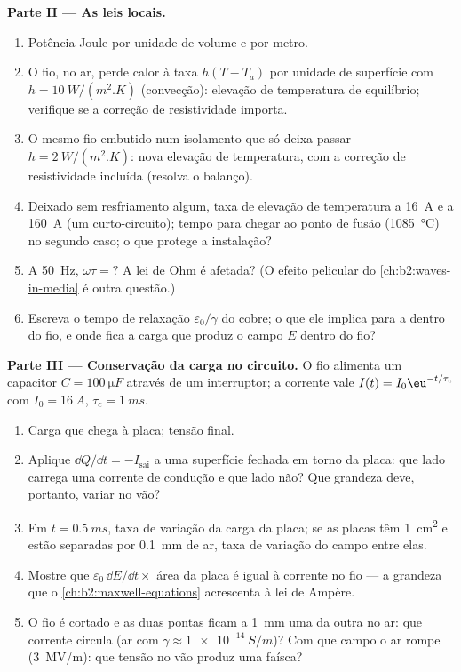 \begin{problem}
\medskip
\noindent\textbf{Parte II --- As leis locais.}
\begin{enumerate}[resume]
  \item Potência Joule por unidade de volume e por metro.
  \item O fio, no ar, perde calor à taxa $h(T - T_a)$ por unidade de
        superfície com $h = \qty{10}{W/(m^2.K)}$ (convecção): elevação de
        temperatura de equilíbrio; verifique se a correção de resistividade
        importa.
  \item O mesmo fio embutido num isolamento que só deixa passar $h =
        \qty{2}{W/(m^2.K)}$: nova elevação de temperatura, com a
        correção de resistividade incluída (resolva o balanço).
  \item Deixado sem resfriamento algum, taxa de elevação de temperatura a \qty{16}{A}
        e a \qty{160}{A} (um curto-circuito); tempo para chegar ao ponto de
        fusão (\qty{1085}{\degreeCelsius}) no segundo caso; o que protege
        a instalação?
  \item A \qty{50}{Hz}, $\omega\tau = ?$ A lei de Ohm é afetada? (O efeito
        pelicular do \cref{ch:b2:waves-in-media} é outra questão.)
  \item Escreva o tempo de relaxação $\varepsilon_0/\gamma$ do cobre; o que ele
        implica para a  dentro do fio, e onde fica
        a carga que produz o campo $E$ dentro do fio?
\end{enumerate}

\medskip
\noindent\textbf{Parte III --- Conservação da carga no circuito.}
O fio alimenta um capacitor $C = \qty{100}{\micro F}$ através de um interruptor; a
corrente vale $I(t) = I_0\eu^{-t/\tau_c}$ com $I_0 = \qty{16}{A}$, $\tau_c = \qty{1}{ms}$.
\begin{enumerate}[resume]
  \item Carga que chega à placa; tensão final.
  \item Aplique $\dd Q/\dd t = -I_{\text{sai}}$ a uma superfície fechada em torno da
        placa: que lado carrega uma corrente de condução e que lado não?
        Que grandeza deve, portanto, variar no vão?
  \item Em $t = \qty{0.5}{ms}$, taxa de variação da carga da placa; se as
        placas têm \qty{1}{cm^2} e estão separadas por \qty{0.1}{mm} de ar, taxa de
        variação do campo entre elas.
  \item Mostre que $\varepsilon_0\,\dd E/\dd t \times$ área da placa é igual à corrente
        no fio --- a grandeza que o \cref{ch:b2:maxwell-equations}
        acrescenta à lei de Ampère.
  \item O fio é cortado e as duas pontas ficam a \qty{1}{mm} uma da outra no ar:
        que corrente circula (ar com $\gamma \approx \qty{1e-14}{S/m}$)? Com que
        campo o ar rompe (\qty{3}{MV/m}): que tensão no
        vão produz uma faísca?
\end{enumerate}


\end{problem}

